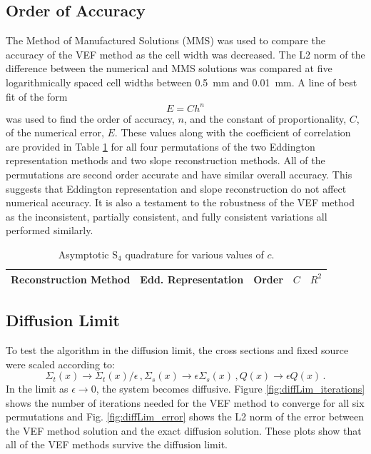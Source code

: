 \subsection{Order of Accuracy}
The Method of Manufactured Solutions (MMS) was used to compare the accuracy of the VEF method as the cell width was decreased. The L2 norm of the difference between the numerical and MMS solutions was compared at five logarithmically spaced cell widths between \SI{0.5}{mm} and \SI{0.01}{mm}. A line of best fit of the form 
	\begin{equation} 
		E = C h^n 
	\end{equation}
was used to find the order of accuracy, $n$, and the constant of proportionality, $C$, of the numerical error, $E$. These values along with the coefficient of correlation are provided in Table \ref{tab:mms} for all four permutations of the two Eddington representation methods and two slope reconstruction methods. All of the permutations are second order accurate and have similar overall accuracy. This suggests that Eddington representation and slope reconstruction do not affect numerical accuracy. It is also a testament to the robustness of the VEF method as the inconsistent, partially consistent, and fully consistent variations all performed similarly. 
	\begin{table}[!h] \centering
	\begin{tabular}{|c|c|c|c|c|}
	\hline
	\hline
	Reconstruction Method & Edd. Representation & Order & $C$ & $R^2$ \\ 
	\hline
		
	\hline
	\hline
	\end{tabular}
	\caption{Asymptotic S$_4$ quadrature for various values of $c$.}
	\label{tab:mms}
	\end{table}
	\afterpage{\clearpage}

\subsection{Diffusion Limit}
To test the algorithm in the diffusion limit, the cross sections and fixed source were scaled according to: 
	\begin{subequations} \label{res:scaling}
	\begin{equation} 
		\Sigma_t(x) \rightarrow \Sigma_t(x)/\epsilon\,, 
	\end{equation}
	\begin{equation}
		\Sigma_s(x) \rightarrow \epsilon \Sigma_s(x) \,,
	\end{equation}
	\begin{equation}
		Q(x) \rightarrow \epsilon Q(x)\,. 
	\end{equation}
	\end{subequations}
In the limit as $\epsilon \rightarrow 0$, the system becomes diffusive. Figure \ref{fig:diffLim_iterations} shows the number of iterations needed for the VEF method to converge for all six permutations and Fig. \ref{fig:diffLim_error} shows the L2 norm of the error between the VEF method solution and the exact diffusion solution. These plots show that all of the VEF methods survive the diffusion limit. 

